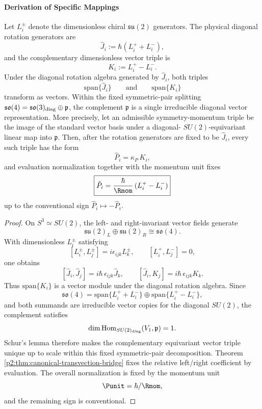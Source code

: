 \documentclass[12pt,a4paper]{article}
\begin{document}
\paragraph{Derivation of Specific Mappings}

\begin{proposition}
\label{p2:prop:momentum-unique}
Let \(L_i^\pm\) denote the dimensionless chiral \(\mathfrak{su}(2)\) generators.  The physical diagonal rotation generators are
\[
\hat J_i:=\hbar(L_i^+ + L_i^-),
\]
and the complementary dimensionless vector triple is
\[
K_i:=L_i^+-L_i^-.
\]
Under the diagonal rotation algebra generated by \(\hat J_i\), both triples
\[
\mathrm{span}\{\hat J_i\}
\qquad\text{and}\qquad
\mathrm{span}\{K_i\}
\]
transform as vectors.  Within the fixed symmetric-pair splitting
\(\mathfrak{so}(4)=\mathfrak{so}(3)_{\rm diag}\oplus\mathfrak p\), the
complement \(\mathfrak p\) is a single irreducible diagonal vector
representation.  More precisely, let an admissible symmetry-momentum triple
be the image of the standard vector basis under a diagonal-
\(SU(2)\)-equivariant linear map into \(\mathfrak p\).  Then, after the
rotation generators are fixed to be \(\hat J_i\), every such triple has the
form
\[
\hat P_i = \kappa_P\,K_i,
\]
and evaluation normalization together with the momentum unit fixes
\[
\boxed{\hat P_i = \frac{\hbar}{\Rmom}\,(L_i^+ - L_i^-)}
\]
up to the conventional sign \(\hat P_i\mapsto -\hat P_i\).
\end{proposition}

\begin{proof}
On \(S^3\simeq SU(2)\), the left- and right-invariant vector fields generate
\[
\mathfrak{su}(2)_L\oplus\mathfrak{su}(2)_R \cong \mathfrak{so}(4).
\]
With dimensionless \(L_i^\pm\) satisfying
\[
[L_i^\pm,L_j^\pm]=i\epsilon_{ijk}L_k^\pm,
\qquad
[L_i^+,L_j^-]=0,
\]
one obtains
\[
[\hat J_i,\hat J_j]=i\hbar\,\epsilon_{ijk}\hat J_k,
\qquad
[\hat J_i,K_j]=i\hbar\,\epsilon_{ijk}K_k.
\]
Thus \(\mathrm{span}\{K_i\}\) is a vector module under the diagonal rotation algebra. Since
\[
\mathfrak{so}(4)=\mathrm{span}\{L_i^+ + L_i^-\}\oplus \mathrm{span}\{L_i^+-L_i^-\},
\]
and both summands are irreducible vector copies for the diagonal \(SU(2)\), the
complement satisfies
\[
\dim\operatorname{Hom}_{SU(2)_{\rm diag}}(V_1,\mathfrak p)=1.
\]
Schur's lemma therefore makes the complementary equivariant vector triple
unique up to scale within this fixed symmetric-pair decomposition.  Theorem~
\ref{p2:thm:canonical-transvection-bridge} fixes the relative left/right
coefficient by evaluation.  The overall normalization is fixed by the momentum unit
\[
\Punit=\hbar/\Rmom,
\]
and the remaining sign is conventional.
\end{proof}
\end{document}
